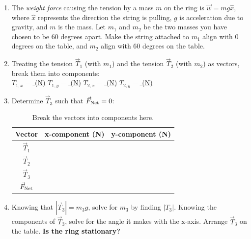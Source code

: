 \documentclass{article}
\begin{document}
\begin{enumerate}
\item The \textit{weight force} causing the tension by a mass $m$ on the ring is $\vec{w} = m g \hat{x}$, where $\hat{x}$ represents the direction the string is pulling, $g$ is acceleration due to gravity, and $m$ is the mass.  Let $m_1$ and $m_2$ be the two masses you have chosen to be 60 degrees apart.  Make the string attached to $m_1$ align with 0 degrees on the table, and $m_2$ align with 60 degrees on the table.
\item Treating the tension $\vec{T}_1$ (with $m_1$) and the tension $\vec{T}_2$ (with $m_2$) as vectors, break them into components:
\\
\underline{$T_{1,x}=$ \hspace{1cm} (N)} \hspace{0.5cm} \underline{$T_{1,y}=$ \hspace{1cm} (N)} \hspace{0.5cm} \underline{$T_{2,x}=$ \hspace{1cm} (N)} \hspace{0.5cm} \underline{$T_{2,y}=$ \hspace{1cm} (N)}
\item Determine $\vec{T}_3$ such that $\vec{F}_{\rm Net} = 0$:
\begin{table}[hb]
\centering
\begin{tabular}{| c | c | c |}
\hline
Vector & x-component (N) & y-component (N) \\ \hline
$\vec{T}_1$ & & \\ \hline
$\vec{T}_2$ & & \\ \hline
$\vec{T}_3$ & & \\ \hline
$\vec{F}_{\rm Net}$ & & \\ \hline
\end{tabular}
\caption{\label{tab:data} Break the vectors into components here.}
\end{table}
\item Knowing that $|\vec{T}_3| = m_3 g$, solve for $m_3$ by finding $|T_{3}|$.  Knowing the components of $\vec{T}_3$, solve for the angle it makes with the x-axis.  Arrange $\vec{T}_3$ on the table.  \textbf{Is the ring stationary?}
\end{enumerate}
\end{document}
